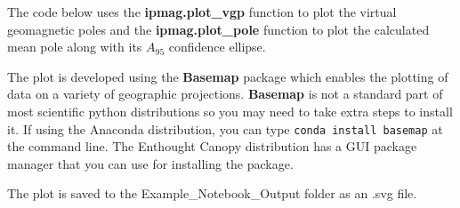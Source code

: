\documentclass{article}
\begin{document}
The code below uses the \textbf{ipmag.plot\_vgp} function to plot the
virtual geomagnetic poles and the \textbf{ipmag.plot\_pole} function to
plot the calculated mean pole along with its \(A_{95}\) confidence
ellipse.

The plot is developed using the \textbf{Basemap} package which enables
the plotting of data on a variety of geographic projections.
\textbf{Basemap} is not a standard part of most scientific python
distributions so you may need to take extra steps to install it. If
using the Anaconda distribution, you can type
\texttt{conda\ install\ basemap} at the command line. The Enthought
Canopy distribution has a GUI package manager that you can use for
installing the package.

The plot is saved to the Example\_Notebook\_Output folder as an .svg
file.
\end{document}

